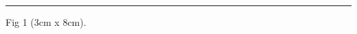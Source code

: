 \documentclass[a4paper,11pt]{article}
\begin{document}
\maketitle

\begin{swarmwrap}%
  \begin{minipage}[t]{3cm}
    \centering
    \rule{\linewidth}{8cm}
    {\footnotesize Fig 1 (3cm x 8cm).}
  \end{minipage}%
\end{swarmwrap}%
\swarmwrapnext
\lipsum[1]\lipsum[2]\lipsum[3]\lipsum[4]\lipsum[5]
\end{document}
